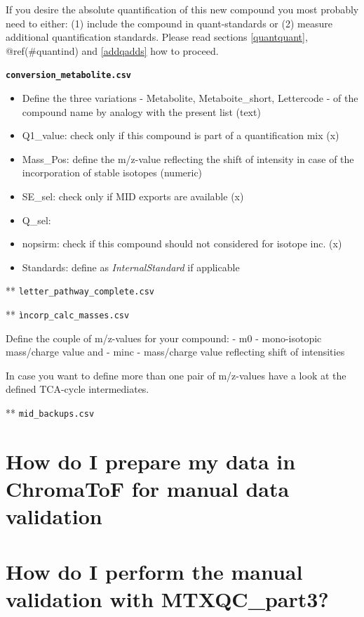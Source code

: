 \documentclass[]{book}
\providecommand{\tightlist}{%
  \setlength{\itemsep}{0pt}\setlength{\parskip}{0pt}}
\theoremstyle{definition}
\theoremstyle{definition}
\theoremstyle{definition}
\theoremstyle{remark}
\begin{document}
If you desire the absolute quantification of this new compound you most
probably need to either: (1) include the compound in quant-standards or
(2) measure additional quantification standards. Please read sections
\ref{quantquant}, @ref(\#quantind) and \ref{addqadds} how to proceed.

\textbf{\texttt{conversion\_metabolite.csv}}

\begin{itemize}
\tightlist
\item
  Define the three variations - Metabolite, Metaboite\_short, Lettercode
  - of the compound name by analogy with the present list (text)
\item
  Q1\_value: check only if this compound is part of a quantification mix
  (x)
\item
  Mass\_Pos: define the m/z-value reflecting the shift of intensity in
  case of the incorporation of stable isotopes (numeric)
\item
  SE\_sel: check only if MID exports are available (x)
\item
  Q\_sel:
\item
  nopsirm: check if this compound should not considered for isotope inc.
  (x)
\item
  Standards: define as \emph{InternalStandard} if applicable
\end{itemize}

** \texttt{letter\_pathway\_complete.csv}

** \texttt{ìncorp\_calc\_masses.csv}

Define the couple of m/z-values for your compound: - m0 - mono-isotopic
mass/charge value and - minc - mass/charge value reflecting shift of
intensities

In case you want to define more than one pair of m/z-values have a look
at the defined TCA-cycle intermediates.

** \texttt{mid\_backups.csv}

\section{How do I prepare my data in ChromaToF for manual data
validation}\label{howmanval-chroma}

\section{How do I perform the manual validation with
MTXQC\_part3?}\label{howmanval-part3}
\end{document}
